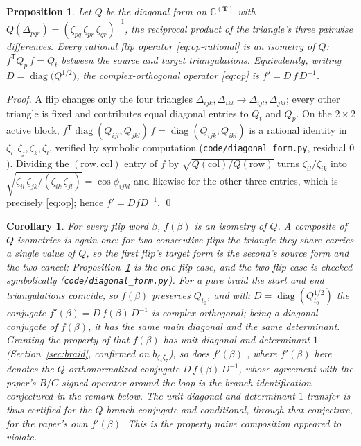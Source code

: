 \documentclass[11pt]{article}
\theoremstyle{plain}
\newtheorem{proposition}[theorem]{Proposition}
\newtheorem{corollary}[theorem]{Corollary}
\theoremstyle{definition}
\theoremstyle{remark}
\newcommand{\zk}[2]{\zeta_{#1#2}}
\begin{document}
\begin{proposition}\label{prop:similar}
Let $Q$ be the diagonal form on $\mathbb{C}^{(\mathbf T)}$ with
$Q(\Delta_{pqr})=(\zk pq\,\zk pr\,\zk qr)^{-1}$, the reciprocal product of the triangle's three
pairwise differences. Every rational flip operator \eqref{eq:op-rational} is an isometry of $Q$:
$f^{\mathsf T}Q_p\,f=Q_t$ between the source and target triangulations. Equivalently, writing
$D=\operatorname{diag}\big(Q^{1/2}\big)$, the complex-orthogonal operator \eqref{eq:op} is
$f'=D\,f\,D^{-1}$.
\end{proposition}
\begin{proof}
A flip changes only the four triangles $\Delta_{ijk},\Delta_{ikl}\to\Delta_{ijl},\Delta_{jkl}$;
every other triangle is fixed and contributes equal diagonal entries to $Q_t$ and $Q_p$. On the
$2\times2$ active block, $f^{\mathsf T}\operatorname{diag}(Q_{ijl},Q_{jkl})\,f
=\operatorname{diag}(Q_{ijk},Q_{ikl})$ is a rational identity in $\zeta_i,\zeta_j,\zeta_k,\zeta_l$,
verified by symbolic computation (\texttt{code/diagonal\_form.py}, residual $0$). Dividing the
$(\mathrm{row},\mathrm{col})$ entry of $f$ by $\sqrt{Q(\mathrm{col})/Q(\mathrm{row})}$ turns
$\zk il/\zk ik$ into $\sqrt{\zk il\,\zk jk/(\zk ik\,\zk jl)}=\cos\phi_{ijkl}$ and likewise for the
other three entries, which is precisely \eqref{eq:op}; hence $f'=DfD^{-1}$. \qed
\end{proof}

\begin{corollary}\label{cor:unitdiag}
For every flip word $\beta$, $f(\beta)$ is an isometry of $Q$. A composite of $Q$-isometries is again
one: for two consecutive flips the triangle they share carries a single value of $Q$, so the first
flip's target form is the second's source form and the two cancel; Proposition~\ref{prop:similar} is
the one-flip case, and the two-flip case is checked symbolically
(\texttt{code/diagonal\_form.py}). For a pure braid the start and end triangulations coincide,
so $f(\beta)$ preserves $Q_{t_0}$, and with $D=\operatorname{diag}(Q_{t_0}^{1/2})$ the conjugate
$f'(\beta)=D\,f(\beta)\,D^{-1}$ is complex-orthogonal; being a diagonal conjugate of $f(\beta)$, it has
the same main diagonal and the same determinant. Granting the property of \cite{rohozhkin2026} that
$f(\beta)$ has unit diagonal and determinant $1$ (Section~\ref{sec:braid}, confirmed on
$b_{\zeta_4\zeta_7}$), so does $f'(\beta)$ , where $f'(\beta)$ here denotes the $Q$-orthonormalized
conjugate $D\,f(\beta)\,D^{-1}$, whose agreement with the paper's $B/C$-signed operator around the loop
is the branch identification conjectured in the remark below. The unit-diagonal and determinant-$1$
transfer is thus certified for the $Q$-branch conjugate and conditional, through that conjecture, for the
paper's \emph{own} $f'(\beta)$. This is the property naive composition appeared to violate.
\end{corollary}
\end{document}
